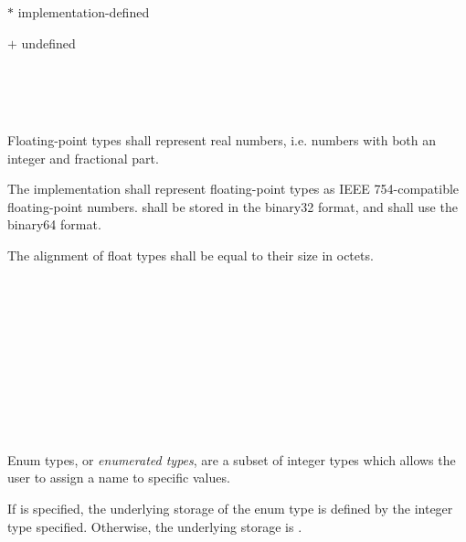 $\ast$ implementation-defined

$+$ undefined


\begin{grammar}
 \\
	 \\
	 \\
\end{grammar}

\specsubsubitem
Floating-point types shall represent real numbers, i.e. numbers with both an
integer and fractional part.

\specsubsubitem
The implementation shall represent floating-point types as IEEE 754-compatible
floating-point numbers.  shall be stored in the binary32 format,
and  shall use the binary64 format.

\specsubsubitem
The alignment of float types shall be equal to their size in octets.


\begin{grammar}
 \\
	 \terminal{\{}  \terminal{\}} \\
	  \terminal{\{}  \terminal{\}} \\

 \\
	 \optional{\terminal{,}} \\
	 \terminal{,}  \\

 \\
	 \\
	 \terminal{=}  \\
\end{grammar}

\specsubsubitem
Enum types, or \textit{enumerated types}, are a subset of integer types which
allows the user to assign a name to specific values.

\specsubsubitem
If  is specified, the underlying storage of the enum
type is defined by the integer type specified. Otherwise, the underlying storage
is .

